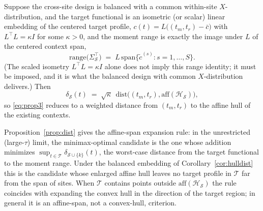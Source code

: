 \begin{corollary}
\label{cor:hulldist}
Suppose the cross-site design is balanced with a common within-site
$X$-distribution, and the target functional is an isometric (or scalar) linear
embedding of the centered target profile,
$c(t)=L\bigl((t_m,t_r)-\bar c\bigr)$ with $L^\top L=\kappa I$ for some
$\kappa>0$, and the moment range is exactly the image under $L$ of the
centered context span,
\[
\mathrm{range}\bigl(\Sigma_\mathcal{S}^\top\bigr)
 \;=\; L\,\mathrm{span}\bigl\{\tilde c^{(s)}:s=1,\dots,S\bigr\}.
\]
(The scaled isometry $L^\top L=\kappa I$ alone does not imply this range
identity; it must be imposed, and it is what the balanced design with common
$X$-distribution delivers.) Then
\[
\delta_\mathcal{S}(t)\;=\;\sqrt{\kappa}\;\,
 \mathrm{dist}\bigl((t_m,t_r),\mathrm{aff}(\mathcal{H}_\mathcal{S})\bigr),
\]
so \eqref{eq:prop3} reduces to a weighted distance from $(t_m,t_r)$ to the
affine hull of the existing contexts.
\end{corollary}

Proposition~\ref{prop:dist} gives the affine-span expansion rule: in
the unrestricted (large-$\tau$) limit, the minimax-optimal candidate is the one
whose addition minimizes $\sup_{t \in \mathcal{T}} \delta_{\mathcal{S}\cup\{k\}}(t)$,
the worst-case distance from the target functional to the moment range. Under
the balanced embedding of Corollary~\ref{cor:hulldist} this is the candidate
whose enlarged affine hull leaves no target profile in $\mathcal{T}$ far
from the span of sites. When $\mathcal{T}$ contains points outside
$\mathrm{aff}(\mathcal{H}_\mathcal{S})$ the rule coincides with expanding the
convex hull in the direction of the target region; in general it is an
affine-span, not a convex-hull, criterion.
